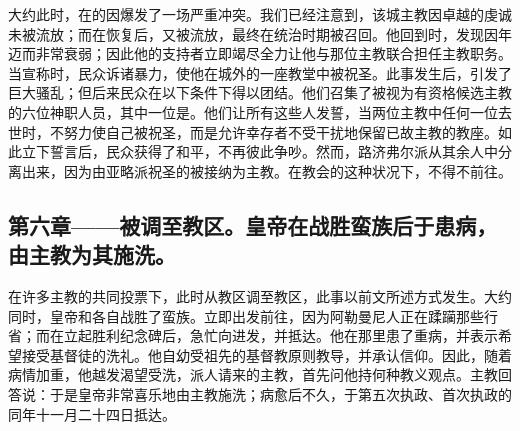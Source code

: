 大约此时，在的因爆发了一场严重冲突。我们已经注意到，该城主教因卓越的虔诚未被流放；而在恢复后，又被流放，最终在统治时期被召回。他回到时，发现因年迈而非常衰弱；因此他的支持者立即竭尽全力让他与那位主教联合担任主教职务。当宣称时，民众诉诸暴力，使他在城外的一座教堂中被祝圣。此事发生后，引发了巨大骚乱；但后来民众在以下条件下得以团结。他们召集了被视为有资格候选主教的六位神职人员，其中一位是。他们让所有这些人发誓，当两位主教中任何一位去世时，不努力使自己被祝圣，而是允许幸存者不受干扰地保留已故主教的教座。如此立下誓言后，民众获得了和平，不再彼此争吵。然而，路济弗尔派从其余人中分离出来，因为由亚略派祝圣的被接纳为主教。在教会的这种状况下，不得不前往。\par


\subsection{第六章——被调至教区。皇帝在战胜蛮族后于患病，由主教为其施洗。}

在许多主教的共同投票下，此时从教区调至教区，此事以前文所述方式发生。大约同时，皇帝和各自战胜了蛮族。立即出发前往，因为阿勒曼尼人正在蹂躏那些行省；而在立起胜利纪念碑后，急忙向进发，并抵达。他在那里患了重病，并表示希望接受基督徒的洗礼。他自幼受祖先的基督教原则教导，并承认信仰。因此，随着病情加重，他越发渴望受洗，派人请来的主教，首先问他持何种教义观点。主教回答说：于是皇帝非常喜乐地由主教施洗；病愈后不久，于第五次执政、首次执政的同年十一月二十四日抵达。\par


